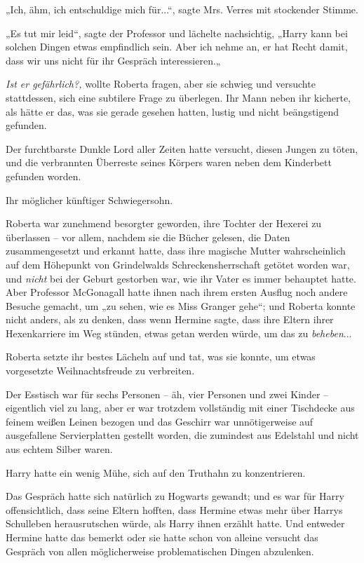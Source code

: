 {„Ich, ähm, ich entschuldige mich für...“, sagte Mrs. Verres mit stockender Stimme.

„Es tut mir leid“, sagte der Professor und lächelte nachsichtig, „Harry kann bei solchen Dingen etwas empfindlich sein. Aber ich nehme an, er hat Recht damit, dass wir uns nicht für ihr Gespräch interessieren.„

\emph{Ist er gefährlich?,} wollte Roberta fragen, aber sie schwieg und versuchte stattdessen, sich eine subtilere Frage zu überlegen. Ihr Mann neben ihr kicherte, als hätte er das, was sie gerade gesehen hatten, lustig und nicht beängstigend gefunden.

Der furchtbarste Dunkle Lord aller Zeiten hatte versucht, diesen Jungen zu töten, und die verbrannten Überreste seines Körpers waren neben dem Kinderbett gefunden worden.

Ihr möglicher künftiger Schwiegersohn.

Roberta war zunehmend besorgter geworden, ihre Tochter der Hexerei zu überlassen -- vor allem, nachdem sie die Bücher gelesen, die Daten zusammengesetzt und erkannt hatte, dass ihre magische Mutter wahrscheinlich auf dem Höhepunkt von Grindelwalds Schreckensherrschaft getötet worden war, und \emph{nicht} bei der Geburt gestorben war, wie ihr Vater es immer behauptet hatte. Aber Professor McGonagall hatte ihnen nach ihrem ersten Ausflug noch andere Besuche gemacht, um „zu sehen, wie es Miss Granger gehe“; und Roberta konnte nicht anders, als zu denken, dass wenn Hermine sagte, dass ihre Eltern ihrer Hexenkarriere im Weg stünden, etwas getan werden würde, um das zu \emph{beheben}...

Roberta setzte ihr bestes Lächeln auf und tat, was sie konnte, um etwas vorgesetzte Weihnachtsfreude zu verbreiten.

Der Esstisch war für sechs Personen -- äh, vier Personen und zwei Kinder -- eigentlich viel zu lang, aber er war trotzdem vollständig mit einer Tischdecke aus feinem weißen Leinen bezogen und das Geschirr war unnötigerweise auf ausgefallene Servierplatten gestellt worden, die zumindest aus Edelstahl und nicht aus echtem Silber waren.

Harry hatte ein wenig Mühe, sich auf den Truthahn zu konzentrieren.

Das Gespräch hatte sich natürlich zu Hogwarts gewandt; und es war für Harry offensichtlich, dass seine Eltern hofften, dass Hermine etwas mehr über Harrys Schulleben herausrutschen würde, als Harry ihnen erzählt hatte. Und entweder Hermine hatte das bemerkt oder sie hatte schon von alleine versucht das Gespräch von allen möglicherweise problematischen Dingen abzulenken.

}
